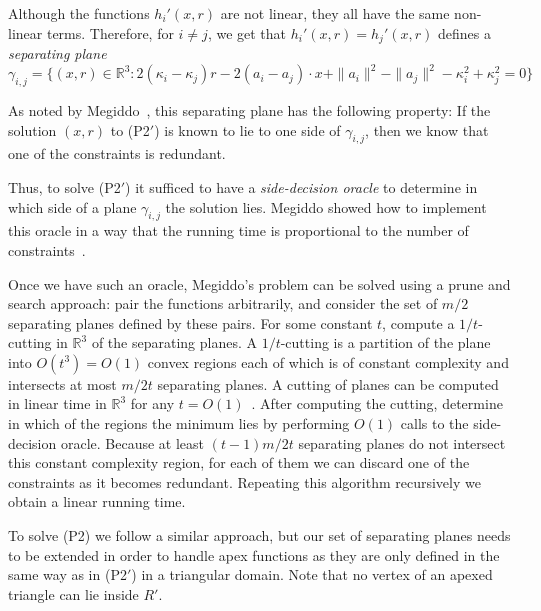 \documentclass[a4paper,UKenglish]{lipics}
\newcommand{\reg}{\ensuremath{R'}}
\begin{document}
Although the functions $h_i'(x,r)$ are not linear, they all have the same non-linear terms. Therefore, for $i\neq j$, we get that
$h_i'(x,r) = h_j'(x, r)$ defines a \emph{separating plane}
$$\gamma_{i,j} = \{(x, r) \in \mathbb{R}^3:  2( \kappa_i - \kappa_j) r - 2 (a_i - a_j) \cdot x + \|a_i\|^2 - \|a_j\|^2 - \kappa_i^2 + \kappa_j^2 = 0\}$$

As noted by Megiddo~\cite{megiddo1989ball}, this separating plane has the following property:
If the solution $(x, r)$ to (P2$'$) is known to lie to one side of $\gamma_{i,j}$, then we know that one of the constraints is redundant. 

Thus, to solve (P2$'$) it sufficed to have a \emph{side-decision oracle} to determine in which side of a plane $\gamma_{i,j}$ the solution lies. Megiddo showed how to implement this oracle in a way that the running time is proportional to the number of constraints~\cite{megiddo1989ball}.

Once we have such an oracle, Megiddo's problem can be solved using a prune and search approach: pair the functions arbitrarily, and consider the set of $m/2$ separating planes defined by these pairs. For some constant $t$, compute a $1/t$-cutting in $\mathbb{R}^3$ of the separating planes.
A $1/t$-cutting is a partition of the plane into $O(t^3) = O(1)$ convex regions each of which is of constant complexity and intersects at most $m/2t$ separating planes.
A cutting of planes can be computed in linear time in $\mathbb{R}^3$ for any $t = O(1)$~\cite{matousekCuttings}.
After computing the cutting, determine in which of the regions the minimum lies by performing $O(1)$ calls to the side-decision oracle. 
Because at least $(t-1)m/2t$ separating planes do not intersect this constant complexity region, for each of them we can discard one of the constraints as it becomes redundant. Repeating this algorithm recursively we obtain a linear running time.

To solve (P2) we follow a similar approach, but our set of separating planes needs to be extended in order to handle apex functions as they are only defined in the same way as in (P2$'$) in a triangular domain.
Note that no vertex of an apexed triangle can lie inside $\reg$.
\end{document}
